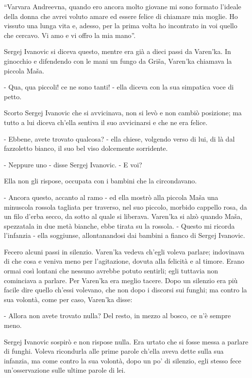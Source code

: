 \label{v-5} 

``Varvara Andreevna, quando ero ancora molto giovane mi sono formato l'ideale della donna che avrei voluto amare ed essere felice di chiamare mia moglie. Ho vissuto una lunga vita e, adesso, per la prima volta ho incontrato in voi quello che cercavo. Vi amo e vi offro la mia mano''. 

Sergej Ivanovic si diceva questo, mentre era già a dieci passi da Varen'ka. In ginocchio e difendendo con le mani un fungo da Griša, Varen'ka chiamava la piccola Maša. 

- Qua, qua piccoli! ce ne sono tanti! - ella diceva con la sua simpatica voce di petto. 

Scorto Sergej Ivanovic che si avvicinava, non si levò e non cambiò posizione; ma tutto a lui diceva ch'ella sentiva il suo avvicinarsi e che ne era felice. 

- Ebbene, avete trovato qualcosa? - ella chiese, volgendo verso di lui, di là dal fazzoletto bianco, il suo bel viso dolcemente sorridente. 

- Neppure uno - disse Sergej Ivanovic. - E voi? 

Ella non gli rispose, occupata con i bambini che la circondavano. 

- Ancora questo, accanto al ramo - ed ella mostrò alla piccola Maša una minuscola rossola tagliata per traverso, nel suo piccolo, morbido cappello rosa, da un filo d'erba secco, da sotto al quale si liberava. Varen'ka si alzò quando Maša, spezzatala in due metà bianche, ebbe tirata su la rossola. - Questo mi ricorda l'infanzia - ella soggiunse, allontanandosi dai bambini a fianco di Sergej Ivanovic. 

Fecero alcuni passi in silenzio. Varen'ka vedeva ch'egli voleva parlare; indovinava di che cosa e veniva meno per l'agitazione, dovuta alla felicità e al timore. Erano ormai così lontani che nessuno avrebbe potuto sentirli; egli tuttavia non cominciava a parlare. Per Varen'ka era meglio tacere. Dopo un silenzio era più facile dire quello ch'essi volevano, che non dopo i discorsi sui funghi; ma contro la sua volontà, come per caso, Varen'ka disse: 

- Allora non avete trovato nulla? Del resto, in mezzo al bosco, ce n'è sempre meno. 

Sergej Ivanovic sospirò e non rispose nulla. Era urtato che si fosse messa a parlare di funghi. Voleva ricondurla alle prime parole ch'ella aveva dette sulla sua infanzia, ma come contro la sua volontà, dopo un po' di silenzio, egli stesso fece un'osservazione sulle ultime parole di lei. 

